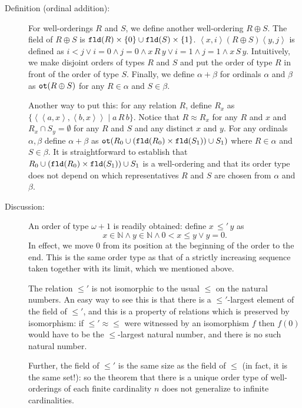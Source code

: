 \documentclass[12pt]{book}
\begin{document}
\begin{description}

\item[Definition (ordinal addition):] For well-orderings $R$ and $S$,
we define another well-ordering $R \oplus S$.  The field of $R \oplus
S$ is ${\tt fld}(R)\times \{0\} \cup {\tt fld}(S)\times \{1\}$.
$\left<x,i\right> (R \oplus S) \left<y,j\right>$ is defined as $i<j
\vee i=0 \wedge j=0 \wedge x\,R\,y \vee i=1 \wedge j=1 \wedge
x\,S\,y$.  Intuitively, we make disjoint orders of types $R$ and $S$
and put the order of type $R$ in front of the order of type $S$.
Finally, we define $\alpha + \beta$ for ordinals $\alpha$ and $\beta$
as ${\tt ot}(R \oplus S)$ for any $R \in \alpha$ and $S \in \beta$.

Another way to put this: for any relation $R$, define $R_x$ as
$\{\left<\left<a,x\right>,\left<b,x\right>\right>\mid a\,R\,b\}$.
Notice that $R\approx R_x$ for any $R$ and $x$ and $R_x \cap S_y =
\emptyset$ for any $R$ and $S$ and any distinct $x$ and $y$.  For any
ordinals $\alpha,\beta$ define $\alpha+\beta$ as ${\tt ot}(R_0 \cup {\tt
(fld}(R_0)\times {\tt fld}(S_1)) \cup S_1)$ where $R \in \alpha$ and $S
\in \beta$.  It is straightforward to establish that $R_0 \cup ({\tt
fld}(R_0)\times {\tt fld}(S_1)) \cup S_1$ is a well-ordering and that
its order type does not depend on which representatives $R$ and $S$
are chosen from $\alpha$ and $\beta$.


\item[Discussion:] An order of type $\omega+1$ is readily obtained:
define $x \,\leq'\,y$ as $$x\in {\mathbb N} \wedge y \in {\mathbb N}
\wedge 0<x\leq y \vee y=0.$$ In effect, we move 0 from its position at
the beginning of the order to the end.  This is the same order type as
that of a strictly increasing sequence taken together with its limit,
which we mentioned above.

The relation $\leq'$ is not isomorphic to the usual $\leq$ on the
natural numbers.  An easy way to see this is that there is a
$\leq'$-largest element of the field of $\leq'$, and this is a
property of relations which is preserved by isomorphism: if $\leq'
\approx \leq$ were witnessed by an isomorphism $f$ then $f(0)$ would
have to be the $\leq$-largest natural number, and there is no such
natural number.

Further, the field of $\leq'$ is the same size as the field of $\leq$
(in fact, it is the same set!): so the theorem that there is a unique
order type of well-orderings of each finite cardinality $n$ does not
generalize to infinite cardinalities.


\end{description}
\end{document}
